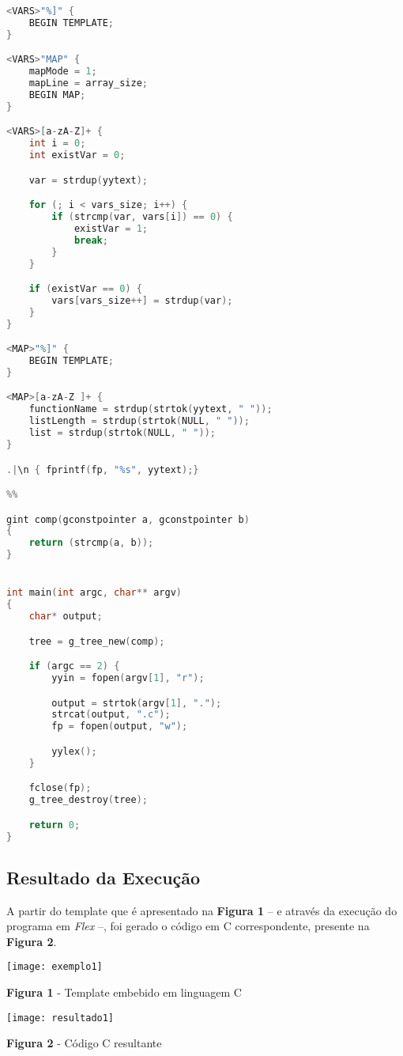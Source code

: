 \documentclass{article}
\begin{document}
\begin{lstlisting}[language=C]
<VARS>"%]" {
	BEGIN TEMPLATE;
}

<VARS>"MAP" { 
	mapMode = 1;
	mapLine = array_size;
	BEGIN MAP;
}

<VARS>[a-zA-Z]+ {
	int i = 0;
	int existVar = 0;

	var = strdup(yytext);

	for (; i < vars_size; i++) {
		if (strcmp(var, vars[i]) == 0) {
			existVar = 1;
			break;
		}
	}

	if (existVar == 0) {
		vars[vars_size++] = strdup(var); 
	}
}

<MAP>"%]" {
	BEGIN TEMPLATE;
}

<MAP>[a-zA-Z ]+ {
	functionName = strdup(strtok(yytext, " "));   
	listLength = strdup(strtok(NULL, " "));
	list = strdup(strtok(NULL, " "));
}

.|\n { fprintf(fp, "%s", yytext);}

%%

gint comp(gconstpointer a, gconstpointer b)
{
	return (strcmp(a, b));
}


int main(int argc, char** argv)
{
	char* output;

	tree = g_tree_new(comp);

	if (argc == 2) {
		yyin = fopen(argv[1], "r");

		output = strtok(argv[1], ".");
		strcat(output, ".c");
		fp = fopen(output, "w");

		yylex();
	}

	fclose(fp);
	g_tree_destroy(tree);	

	return 0;
}

\end{lstlisting}


\newpage
\subsection{Resultado da Execução}

A partir do template que é apresentado na \textbf{Figura 1} -- e através da execução do programa em \emph{Flex} --, foi gerado o código em C correspondente, presente na \textbf{Figura 2}. 

\begin{center}
    \texttt{[image: exemplo1]}
    \caption{\textbf{Figura 1} - Template embebido em linguagem C}
\end{center}

\begin{center}
    \texttt{[image: resultado1]}
    \caption{\textbf{Figura 2} - Código C resultante}
\end{center}
\end{document}
